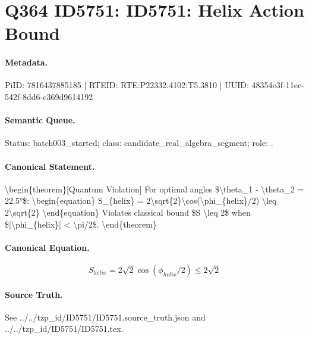 \section*{Q364 ID5751: ID5751: Helix Action Bound}
\paragraph{Metadata.}
PiID: 7816437885185 | RTEID: RTE:P22332.4102:T5.3810 | UUID: 48354e3f-11ec-542f-8dd6-c369d9614192

\paragraph{Semantic Queue.}
Status: batch003\_started; class: candidate\_real\_algebra\_segment; role: .

\paragraph{Canonical Statement.}
\textbackslash{}begin\{theorem\}[Quantum Violation] For optimal angles \$\textbackslash{}theta\_1 - \textbackslash{}theta\_2 = 22.5°\$: \textbackslash{}begin\{equation\} S\_\{helix\} = 2\textbackslash{}sqrt\{2\}\textbackslash{}cos(\textbackslash{}phi\_\{helix\}/2) \textbackslash{}leq 2\textbackslash{}sqrt\{2\} \textbackslash{}end\{equation\} Violates classical bound \$S \textbackslash{}leq 2\$ when \$|\textbackslash{}phi\_\{helix\}| < \textbackslash{}pi/2\$. \textbackslash{}end\{theorem\}

\paragraph{Canonical Equation.}
\[
\begin{equation} S_{helix} = 2\sqrt{2}\cos(\phi_{helix}/2) \leq 2\sqrt{2} \end{equation}
\]

\paragraph{Source Truth.}
See ../../tzp\_id/ID5751/ID5751.source\_truth.json and ../../tzp\_id/ID5751/ID5751.tex.
